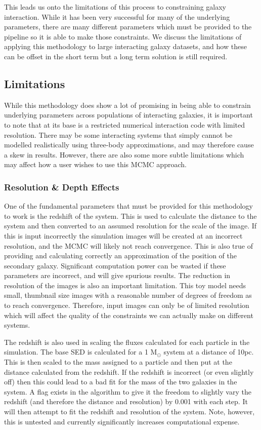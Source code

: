 This leads us onto the limitations of this process to constraining galaxy interaction. While it has been very successful for many of the underlying parameters, there are many different parameters which must be provided to the pipeline so it is able to make those constraints. We discuss the limitations of applying this methodology to large interacting galaxy datasets, and how these can be offset in the short term but a long term solution is still required.

\subsection{Limitations}\label{limitations}
\noindent While this methodology does show a lot of promising in being able to constrain underlying parameters across populations of interacting galaxies, it is important to note that at its base is a restricted numerical interaction code with limited resolution. There may be some interacting systems that simply cannot be modelled realistically using three-body approximations, and may therefore cause a skew in results. However, there are also some more subtle limitations which may affect how a user wishes to use this MCMC approach.

\subsubsection{Resolution \& Depth Effects}\label{resolution_effect}
\noindent One of the fundamental parameters that must be provided for this methodology to work is the redshift of the system. This is used to calculate the distance to the system and then converted to an assumed resolution for the scale of the image. If this is input incorrectly the simulation images will be created at an incorrect resolution, and the MCMC will likely not reach convergence. This is also true of providing and calculating correctly an approximation of the position of the secondary galaxy. Significant computation power can be wasted if these parameters are incorrect, and will give spurious results. The reduction in resolution of the images is also an important limitation. This toy model needs small, thumbnail size images with a reasonable number of degrees of freedom as to reach convergence. Therefore, input images can only be of limited resolution which will affect the quality of the constraints we can actually make on different systems. 

The redshift is also used in scaling the fluxes calculated for each particle in the simulation. The base SED is calculated for a 1 M$_\odot$ system at a distance of 10pc. This is then scaled to the mass assigned to a particle and then put at the distance calculated from the redshift. If the redshift is incorrect (or even slightly off) then this could lead to a bad fit for the mass of the two galaxies in the system. A flag exists in the algorithm to give it the freedom to slightly vary the redshift (and therefore the distance and resolution) by 0.001 with each step. It will then attempt to fit the redshift and resolution of the system. Note, however, this is untested and currently significantly increases computational expense.

